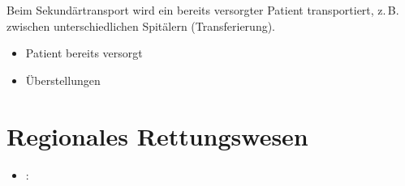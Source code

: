 {Beim Sekundärtransport wird ein bereits versorgter Patient
transportiert, z.\,B. zwischen unterschiedlichen Spitälern
(Transferierung).
}
{\begin{itemize}
  \item Patient bereits versorgt
  \item Überstellungen
\end{itemize}}
{}
{}
{}



\section{Regionales Rettungswesen}

{\TxQuerverweise}
{\begin{itemize}
  \item {}: \dotfill
\end{itemize}}
{}
{}
{}
{}

